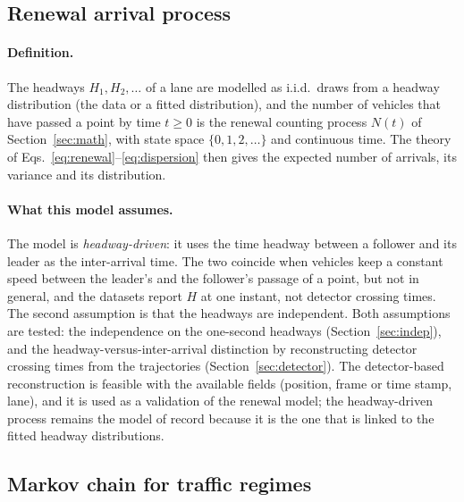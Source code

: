 \documentclass[11pt,a4paper]{article}
\numberwithin{equation}{section}
\begin{document}
\subsection{Renewal arrival process}\label{sec:renewal}
\paragraph{Definition.} The headways $H_1,H_2,\dots$ of a lane are modelled as i.i.d.\ draws from a headway distribution
(the data or a fitted distribution), and the number of vehicles that have passed a point by time $t\ge0$ is the renewal
counting process $N(t)$ of Section~\ref{sec:math}, with state space $\{0,1,2,\dots\}$ and continuous time. The theory of
Eqs.~\eqref{eq:renewal}--\eqref{eq:dispersion} then gives the expected number of arrivals, its variance and its distribution.

\paragraph{What this model assumes.} The model is \emph{headway-driven}: it uses the time headway between a follower and its leader
as the inter-arrival time. The two coincide when vehicles keep a constant speed between the leader's and the follower's
passage of a point, but not in general, and the datasets report $H$ at one instant, not detector crossing times. The second assumption is that the
headways are independent. Both assumptions are tested: the independence on the one-second headways (Section~\ref{sec:indep}), and the headway-versus-inter-arrival distinction by
reconstructing detector crossing times from the trajectories (Section~\ref{sec:detector}). The detector-based reconstruction is feasible with the available fields (position, frame or time stamp, lane),
and it is used as a validation of the renewal model; the headway-driven process remains the model of record because it is the one that is linked to the fitted headway distributions.

\subsection{Markov chain for traffic regimes}\label{sec:markov}
\end{document}

